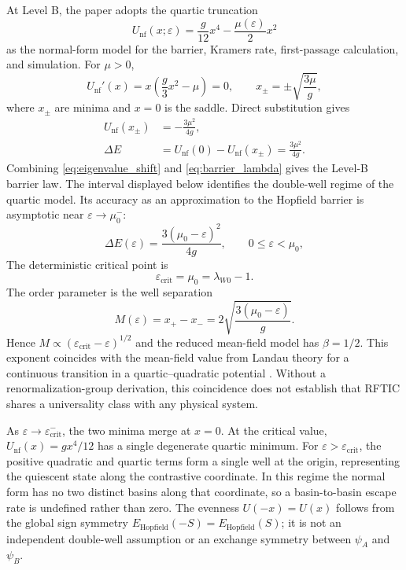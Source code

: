 \documentclass[a4paper,twocolumn,10pt]{article}
\newcommand{\eps}{\varepsilon}
\newcommand{\dE}{\Delta E}
\newcommand{\psiA}{\psi_A}
\newcommand{\psiB}{\psi_B}
\begin{document}
At Level B, the paper adopts the quartic truncation
\begin{equation}
U_{\mathrm{nf}}(x;\eps)=\frac{g}{12}x^4-\frac{\mu(\eps)}{2}x^2
\label{eq:doublewell}
\end{equation}
as the normal-form model for the barrier, Kramers rate, first-passage calculation, and simulation.
For $\mu>0$,
\begin{equation}
U_{\mathrm{nf}}'(x)=x\left(\frac{g}{3}x^2-\mu\right)=0,
\qquad x_\pm=\pm\sqrt{\frac{3\mu}{g}},
\label{eq:wells}
\end{equation}
where $x_\pm$ are minima and $x=0$ is the saddle. Direct substitution gives
\begin{equation}
\begin{aligned}
U_{\mathrm{nf}}(x_\pm)&=-\frac{3\mu^2}{4g},\\
\dE&=U_{\mathrm{nf}}(0)-U_{\mathrm{nf}}(x_\pm)=\frac{3\mu^2}{4g}.
\end{aligned}
\label{eq:barrier_lambda}
\end{equation}
Combining \eqref{eq:eigenvalue_shift} and \eqref{eq:barrier_lambda} gives the Level-B barrier law.
The interval displayed below identifies the double-well regime of the quartic model. Its accuracy
as an approximation to the Hopfield barrier is asymptotic near $\eps\to\mu_0^-$:
\begin{equation}
\boxed{\dE(\eps)=\frac{3(\mu_0-\eps)^2}{4g}},\qquad 0\leq\eps<\mu_0,
\label{eq:barrier}
\end{equation}
The deterministic critical point is
\begin{equation}
\boxed{\eps_{\mathrm{crit}}=\mu_0=\lambda_{W0}-1}.
\label{eq:critical}
\end{equation}
The order parameter is the well separation
\begin{equation}
M(\eps)=x_+-x_-=2\sqrt{\frac{3(\mu_0-\eps)}{g}}.
\label{eq:order_parameter}
\end{equation}
Hence $M\propto(\eps_{\mathrm{crit}}-\eps)^{1/2}$ and the reduced mean-field model has
$\beta=1/2$. This exponent coincides with the mean-field value from Landau theory for a continuous
transition in a quartic--quadratic potential \citep{landau1980statistical}. Without a renormalization-group
derivation, this coincidence does not establish that RFTIC shares a universality class with any
physical system.

As $\eps\to\eps_{\mathrm{crit}}^-$, the two minima merge at $x=0$. At the critical value,
$U_{\mathrm{nf}}(x)=gx^4/12$ has a single degenerate quartic minimum. For
$\eps>\eps_{\mathrm{crit}}$, the positive quadratic and quartic terms form a single well at the
origin, representing the quiescent state along the contrastive coordinate. In this regime the
normal form has no two distinct basins along that coordinate, so a basin-to-basin escape rate is
undefined rather than zero. The evenness $U(-x)=U(x)$ follows from the global sign symmetry
$E_{\mathrm{Hopfield}}(-S)=E_{\mathrm{Hopfield}}(S)$; it is not an independent double-well
assumption or an exchange symmetry between $\psiA$ and $\psiB$.
\end{document}
